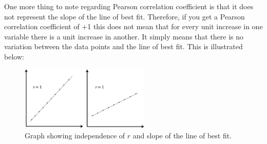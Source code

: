 \clearpage
One more thing to note regarding Pearson correlation coefficient is that it does not represent the slope of the line of best fit.
Therefore, if you get a Pearson correlation coefficient of +1 this does not mean that for every unit increase in one variable there is a unit increase in another.
It simply means that there is no variation between the data points and the line of best fit. This is illustrated below:

\begin{figure}[h]
  \centering
  \captionsetup{width=24pc, justification=centering}
    \includegraphics[width=0.55\textwidth]{images/pearson_graphs_slope.png}
  \caption{Graph showing independence of $r$ and slope of the line of best fit.}
  \label{fig:pearson_graph_slope}
\end{figure}